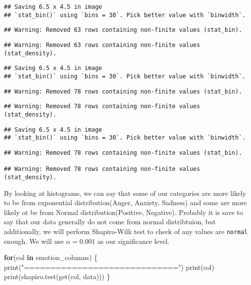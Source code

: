 \documentclass[
]{article}
\newenvironment{Shaded}{\begin{snugshade}}{\end{snugshade}}
\newcommand{\ControlFlowTok}[1]{\textcolor[rgb]{0.13,0.29,0.53}{\textbf{#1}}}
\newcommand{\FunctionTok}[1]{\textcolor[rgb]{0.00,0.00,0.00}{#1}}
\newcommand{\NormalTok}[1]{#1}
\newcommand{\StringTok}[1]{\textcolor[rgb]{0.31,0.60,0.02}{#1}}
\begin{document}
\begin{verbatim}
## Saving 6.5 x 4.5 in image
## `stat_bin()` using `bins = 30`. Pick better value with `binwidth`.
\end{verbatim}

\begin{verbatim}
## Warning: Removed 63 rows containing non-finite values (stat_bin).
\end{verbatim}

\begin{verbatim}
## Warning: Removed 63 rows containing non-finite values (stat_density).
\end{verbatim}

\begin{verbatim}
## Saving 6.5 x 4.5 in image
## `stat_bin()` using `bins = 30`. Pick better value with `binwidth`.
\end{verbatim}

\begin{verbatim}
## Warning: Removed 78 rows containing non-finite values (stat_bin).
\end{verbatim}

\begin{verbatim}
## Warning: Removed 78 rows containing non-finite values (stat_density).
\end{verbatim}

\begin{verbatim}
## Saving 6.5 x 4.5 in image
## `stat_bin()` using `bins = 30`. Pick better value with `binwidth`.
\end{verbatim}

\begin{verbatim}
## Warning: Removed 78 rows containing non-finite values (stat_bin).

## Warning: Removed 78 rows containing non-finite values (stat_density).
\end{verbatim}

By looking at histograms, we can say that some of our categories are
more likely to be from exponential distribution(Anger, Anxiety, Sadness)
and some are more likely ot be from Normal distribution(Positive,
Negative). Probably it is save to say that our data generally do not
come from normal distribtuion, but additionally, we will perform
Shapiro-Wilk test to check of any values are \texttt{normal} enough. We
will use \(\alpha = 0.001\) as our significance level.

\begin{Shaded}
\begin{Highlighting}[]
\ControlFlowTok{for}\NormalTok{(col }\ControlFlowTok{in}\NormalTok{ emotion\_columns) \{}
  \FunctionTok{print}\NormalTok{(}\StringTok{"============================="}\NormalTok{)}
  \FunctionTok{print}\NormalTok{(col)}
  \FunctionTok{print}\NormalTok{(}\FunctionTok{shapiro.test}\NormalTok{(}\FunctionTok{get}\NormalTok{(col, data)))}
\NormalTok{\}}
\end{Highlighting}
\end{Shaded}
\end{document}

